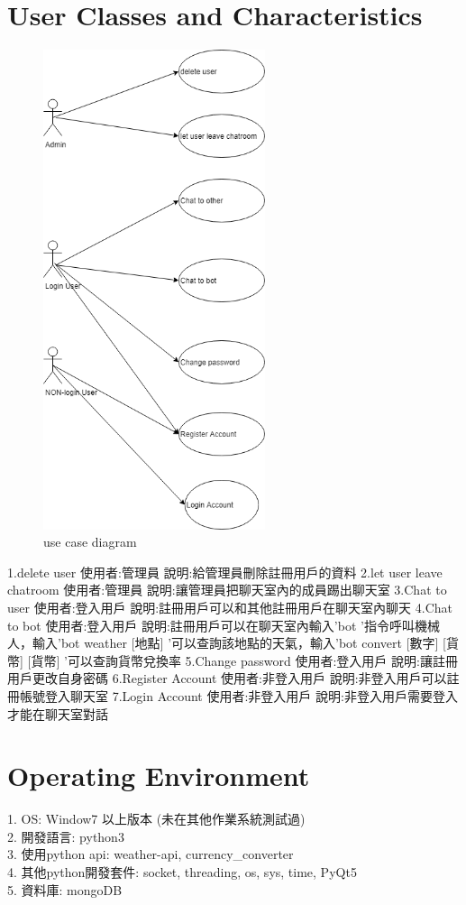 \documentclass{scrreprt}
\begin{document}
\begin{CJK}{UTF8}{bkai}
\section{User Classes and Characteristics}
\begin{figure}[ht]
\begin{center}
\includegraphics[width=6.5cm]{usecasediagram.png}
\end{center}
\caption{use case diagram}
\label{fig:1}
\end{figure}
1.delete user
使用者:管理員
說明:給管理員刪除註冊用戶的資料
2.let user leave chatroom
使用者:管理員
說明:讓管理員把聊天室內的成員踢出聊天室
3.Chat to user
使用者:登入用戶
說明:註冊用戶可以和其他註冊用戶在聊天室內聊天
4.Chat to bot
使用者:登入用戶
說明:註冊用戶可以在聊天室內輸入'bot '指令呼叫機械人，輸入'bot weather [地點] '可以查詢該地點的天氣，輸入'bot convert [數字] [貨幣] [貨幣] '可以查詢貨幣兌換率
 5.Change password
使用者:登入用戶
說明:讓註冊用戶更改自身密碼
6.Register Account
使用者:非登入用戶
說明:非登入用戶可以註冊帳號登入聊天室
7.Login Account
使用者:非登入用戶
說明:非登入用戶需要登入才能在聊天室對話

\section{Operating Environment}
1. OS: Window7 以上版本 (未在其他作業系統測試過) \\
2. 開發語言: python3 \\
3. 使用python api: weather-api, currency_converter \\
4. 其他python開發套件: socket, threading, os, sys, time, PyQt5 \\
5. 資料庫: mongoDB


\end{CJK}
\end{document}
